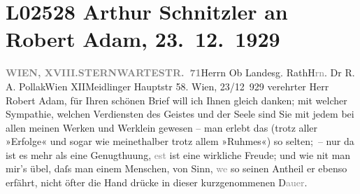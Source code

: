 

\section[Arthur Schnitzler an Robert Adam, 23. 12. 1929]{L02528 Arthur Schnitzler an Robert Adam, 23. 12. 1929}
\nopagebreak{}
\rehead{ }\normalsize\beginnumbering{}
\toendnotes[C]{\smallbreak\pagebreak[2]}
\toendnotes[C]{\smallbreak}\pstart{}{\pb}\label{T_L02528-1v}\label{T_L02528-1}\pend{}\pstart{}\textcolor{gray}{\textbf{WIEN, XVIII.}}\pend{}\pstart{}\textcolor{gray}{\textbf{STERNWARTESTR. 71}}\pend{}{\bigskip}\pstart{}Herrn Ob Landesg. Rath\pend{}\pstart{}H\textcolor{gray}{rn}. Dr R. A. Pollak\pend{}\pstart{}Wien XII\pend{}\pstart{}Meidlinger Hauptstr 58.\pend{}{\bigskip}\vspace{1em}
\pstart
           \raggedleft{}{\pb}Wien, 23/12 929\pend
           \vspace{0.5em}
\pstart
           verehrter Herr Robert Adam, für Ihren schönen Brief will ich Ihnen
               gleich danken; mit welcher Sympathie, welchen Verdiensten des Geistes und der Seele
               sind Sie mit jedem bei allen meinen Werken und Werklein gewesen – man erlebt das
               (trotz aller »Erfolge« und sogar wie meinethalber trotz allem »Ruhmes«) so selten; –
               nur da{\geminationn} ist es mehr als eine Genugthuung,
                  \textcolor{gray}{est} ist eine wirkliche Freude; und wie ni{\geminationm}t man mir’s übel, daſs {\pb}man
               einem Menschen, von Sinn, \introOben{}\textcolor{gray}{we{\geminationn}}\introOben{} so seinen Antheil er ebenso erfährt, nicht öfter die Hand drücke in dieser
               kurzgenommenen D\textcolor{gray}{auer}.\pend
           
